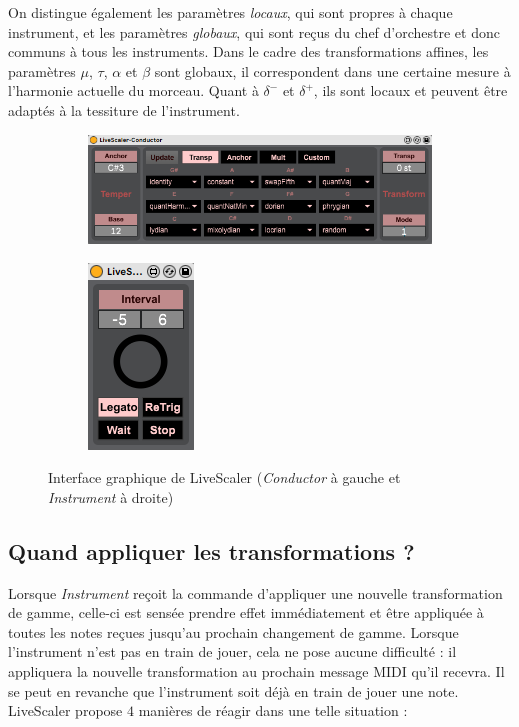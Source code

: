 \documentclass{article}
\begin{document}
On distingue également les paramètres \emph{locaux}, qui sont propres à chaque instrument, et les paramètres \emph{globaux}, qui sont reçus du chef d'orchestre et donc communs à tous les instruments. Dans le cadre des transformations affines, les paramètres $\mu$, $\tau$, $\alpha$  et $\beta$ sont globaux, il correspondent dans une certaine mesure à l'harmonie actuelle du morceau. Quant à $\delta^-$ et $\delta^+$, ils sont locaux et peuvent être adaptés à la tessiture de l'instrument.
\begin{figure}[h]
  \centering
  \begin{subfigure}{0.83\textwidth}
    \includegraphics{Figures/LS-Conductor-UI.png}
  \end{subfigure}
  \begin{subfigure}{0.15\textwidth}
    \includegraphics{Figures/LS-Instrument-UI.png}
  \end{subfigure}

  \caption{Interface graphique de LiveScaler (\emph{Conductor} à gauche  et  \emph{Instrument} à droite) }
  \label{fig:LiveScalerUI}
\end{figure}

\subsection{Quand appliquer les transformations ? }
Lorsque \emph{Instrument} reçoit la commande d'appliquer une nouvelle transformation de gamme, celle-ci est sensée prendre effet immédiatement et être appliquée à toutes les notes reçues jusqu'au prochain changement de gamme. Lorsque l'instrument n'est pas en train de jouer, cela ne pose aucune difficulté : il appliquera la nouvelle transformation au prochain message MIDI qu'il recevra. Il se peut en revanche que l'instrument soit déjà en train de jouer une note. LiveScaler propose $4$ manières de réagir dans une telle situation :
\end{document}
